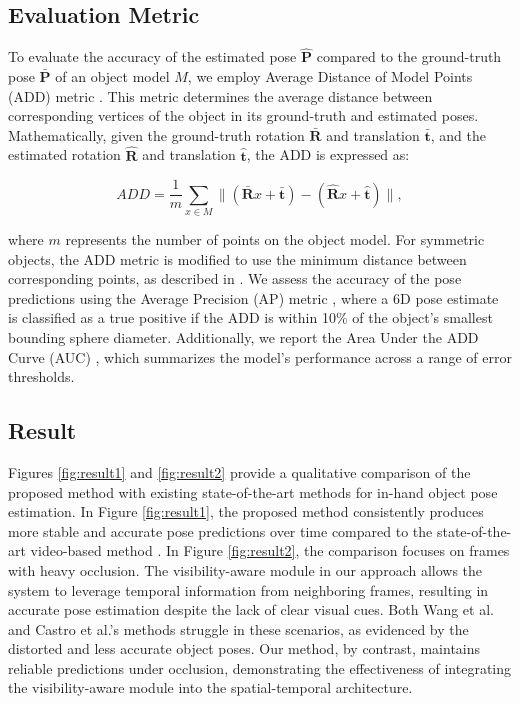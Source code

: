 \subsection{Evaluation Metric}
\label{sec:metric}

To evaluate the accuracy of the estimated pose \(\mathbf{\hat{P}}\) compared to the ground-truth pose \(\mathbf{\bar{P}}\) of an object model \(M\), we employ Average Distance of Model Points (ADD) metric \cite{hinterstoisser2012model}. This metric determines the average distance between corresponding vertices of the object in its ground-truth and estimated poses. Mathematically, given the ground-truth rotation \(\mathbf{\bar{R}}\) and translation \(\mathbf{\bar{t}}\), and the estimated rotation \(\mathbf{\hat{R}}\) and translation \(\mathbf{\hat{t}}\), the ADD is expressed as:

\begin{equation}
ADD = \frac{1}{m} \sum_{x \in M} \parallel (\mathbf{\bar{R}}x + \mathbf{\bar{t}}) - (\mathbf{\hat{R}}x + \mathbf{\hat{t}}) \parallel,
\end{equation}

\noindent where \(m\) represents the number of points on the object model. For symmetric objects, the ADD metric is modified to use the minimum distance between corresponding points, as described in \cite{bregier2017symmetry}. We assess the accuracy of the pose predictions using the Average Precision (AP) metric \cite{bregier2017symmetry}, where a 6D pose estimate is classified as a true positive if the ADD is within 10\% of the object's smallest bounding sphere diameter. Additionally, we report the Area Under the ADD Curve (AUC) \cite{wang2019densefusion}, which summarizes the model's performance across a range of error thresholds.

\subsection{Result}

Figures \ref{fig:result1} and \ref{fig:result2} provide a qualitative comparison of the proposed method with existing state-of-the-art methods for in-hand object pose estimation. In Figure \ref{fig:result1}, the proposed method consistently produces more stable and accurate pose predictions over time compared to the state-of-the-art video-based method \cite{wang2023deep}. In Figure \ref{fig:result2}, the comparison focuses on frames with heavy occlusion. The visibility-aware module in our approach allows the system to leverage temporal information from neighboring frames, resulting in accurate pose estimation despite the lack of clear visual cues. Both Wang et al. and Castro et al.'s methods struggle in these scenarios, as evidenced by the distorted and less accurate object poses. Our method, by contrast, maintains reliable predictions under occlusion, demonstrating the effectiveness of integrating the visibility-aware module into the spatial-temporal architecture.


